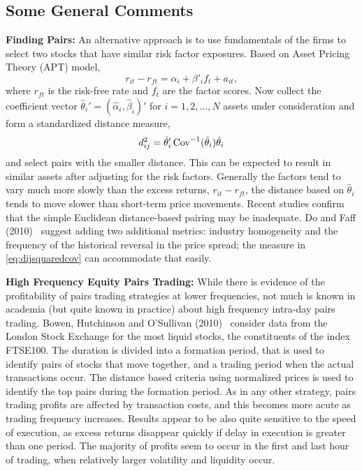 \subsection{Some General Comments}

\noindent\textbf{Finding Pairs:} An alternative approach is to use fundamentals of the firms to select two stocks that have similar risk factor exposures. Based on Asset Pricing Theory (APT) model,
	\begin{equation}
	r_{it} - r_{ft} = \alpha_i + \beta'_if_t + a_{it},
	\end{equation}
where $r_{ft}$ is the risk-free rate and $f_t$ are the factor scores. Now collect the coefficient vector $\hat{\theta}_i' = (\hat{\alpha}_i, \hat{\beta}_i)'$ for $i = 1, 2, \ldots, N$ assets under consideration and form a standardized distance measure,
	\begin{equation} \label{eq:dijsquaredcov}
	d_{ij}^2 = \hat{\theta}_i' \cov^{-1}(\hat{\theta}_i)\hat{\theta}_i
	\end{equation}
and select pairs with the smaller distance. This can be expected to result in similar assets after adjusting for the risk factors. Generally the factors tend to vary much more slowly than the excess returns, $r_{it} - r_{ft}$, the distance based on $\hat{\theta}_i$ tends to move slower than short-term price movements. Recent studies confirm that the simple Euclidean distance-based pairing may be inadequate. Do and Faff (2010)~\cite{do2010does} suggest adding two additional metrics: industry homogeneity and the frequency of the historical reversal in the price spread; the measure in \eqref{eq:dijsquaredcov} can accommodate that easily. \twomedskip


\noindent\textbf{High Frequency Equity Pairs Trading:} While there is evidence of the profitability of pairs trading strategies at lower frequencies, not much is known in academia (but quite known in practice) about high frequency intra-day pairs trading. Bowen, Hutchinson and O'Sullivan (2010)~\cite{bho} consider data from the London Stock Exchange for the most liquid stocks, the constituents of the index FTSE100. The duration is divided into a formation period, that is used to identify pairs of stocks that move together, and a trading period when the actual transactions occur. The distance based criteria using normalized prices is used to identify the top pairs during the formation period. As in any other strategy, pairs trading profits are affected by transaction costs, and this becomes more acute as trading frequency increases. Results appear to be also quite sensitive to the speed of execution, as excess returns disappear quickly if delay in execution is greater than one period. The majority of profits seem to occur in the first and last hour of trading, when relatively larger volatility and liquidity occur.


